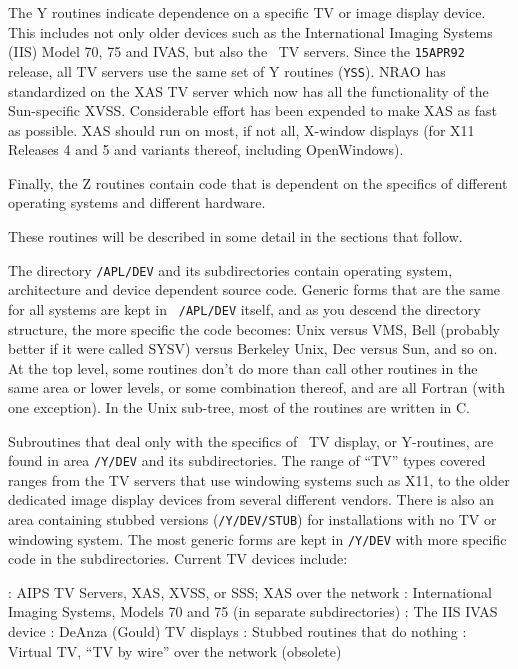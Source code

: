 The Y routines indicate dependence on a specific TV or image display
device.  This includes not only older devices such as the International
Imaging Systems (IIS) Model 70, 75 and IVAS, but also the \AIPS\ TV
servers.  Since the {\tt 15APR92} release, all TV servers use the same
set of Y routines ({\tt\dol YSS}).  NRAO has standardized on the XAS TV
server which now has all the functionality of the Sun-specific XVSS.
Considerable effort has been expended to make XAS as fast as possible.
XAS should run on most, if not all, X-window displays (for X11 Releases
4 and 5 and variants thereof, including OpenWindows).

Finally, the Z routines contain code that is dependent on the
specifics of different operating systems and different hardware.

These routines will be described in some detail in the sections that
follow. \medskip


The directory {\tt \thisver/APL/DEV} and its subdirectories contain
operating system, architecture and device dependent source code.
Generic forms that are the same for all systems are kept in {\tt
\thisver/APL/DEV} itself, and as you descend the directory structure,
the more specific the code becomes: Unix versus VMS, Bell (probably
better if it were called SYSV) versus Berkeley Unix, Dec versus Sun,
and so on.  At the top level, some routines don't do more than call
other routines in the same area or lower levels, or some combination
thereof, and are all Fortran (with one exception).
In the Unix sub-tree, most of the routines are written in C.\medskip


Subroutines that deal only with the specifics of \AIPS\ TV display, or
Y-routines, are found in area {\tt \thisver/Y/DEV} and its
subdirectories.  The range of ``TV'' types covered ranges from the TV
servers that use windowing systems such as X11, to the older dedicated
image display devices from several different vendors.  There is also an
area containing stubbed versions ({\tt \thisver/Y/DEV/STUB}) for
installations with no TV or windowing system.  The most generic forms
are kept in {\tt \thisver/Y/DEV} with more specific code in the
subdirectories.  Current TV devices include:\medskip\medskip

\vbox{
{: AIPS TV Servers, XAS, XVSS, or SSS; XAS over the network}
{: International Imaging Systems, Models 70 and 75
                (in separate subdirectories)}
{: The IIS IVAS device}
{: DeAnza (Gould) TV displays}
{: Stubbed routines that do nothing}
{: Virtual TV, ``TV by wire'' over the network (obsolete)
\medskip}\medskip
}

